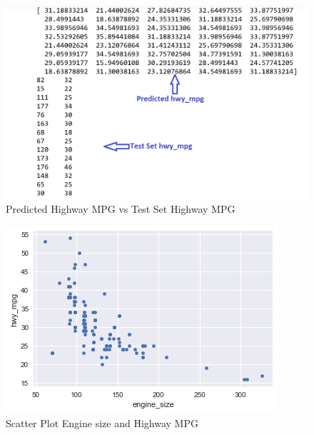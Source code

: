 \begin{figure}[htb]
\includegraphics[width=1.0\columnwidth]{images/testset_pred_hwy_mpg.png}
  \caption{Predicted Highway MPG vs Test Set Highway MPG}
  \label{p:HwyMpg Compare}
\end{figure}



\begin{figure}[htb]
\includegraphics[width=1.0\columnwidth]{images/scatterplot.png}
  \caption{Scatter Plot Engine size and Highway MPG}
  \label{p:scatterplt}
\end{figure}

